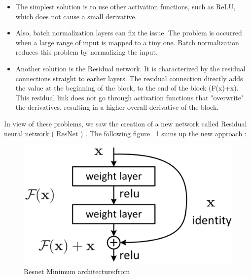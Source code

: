 \documentclass[a4paper]{article}
\begin{document}
\begin{itemize}
    \item{The simplest solution is to use other activation functions, such as ReLU, which does not cause a small derivative.}
    \item{Also, batch normalization layers can fix the issue. The problem is occurred when a large range of input is mapped to a tiny one. Batch normalization reduces this problem by normalizing the input.}
    \item{Another solution is the Residual network. It is characterized by the residual connections straight to earlier layers. The residual connection directly adds the value at the beginning of the block, to the end of the block (F(x)+x). This residual link does not go through activation functions that "overwrite" the derivatives, resulting in a higher overall derivative of the block.
    }
\end{itemize}
In view of these problems, we saw the creation of a new network called Residual neural network ( ResNet ) . The following figure ~\ref{fig:resnet} sums up the new approach :

 \begin{figure}[H]
      \includegraphics[width=\linewidth]{images/resnet.png}
      \caption{Resnet Minimum architecture:from \cite{he2015deep}}
      \label{fig:resnet}
    \end{figure}
\end{document}
